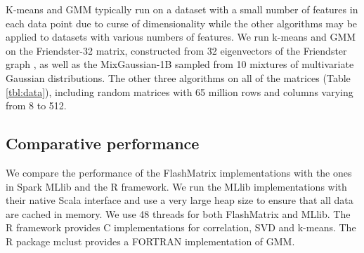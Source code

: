 K-means and GMM typically run on a dataset with a small number of features
in each data point due to curse of dimensionality \cite{Jain00} while
the other algorithms may be applied to datasets with various numbers of
features.
We run k-means and GMM on
the Friendster-32 matrix, constructed from 32 eigenvectors of the Friendster
graph \cite{friendster}, as well as the MixGaussian-1B
sampled from 10 mixtures of multivariate Gaussian distributions.
The other three algorithms on all of the matrices (Table \ref{tbl:data}),
including random matrices with 65 million rows and columns
varying from 8 to 512.

%


\vspace{-8pt}
\subsection{Comparative performance}
\vspace{-4pt}

We compare the performance of the FlashMatrix implementations with the ones in
Spark MLlib \cite{mllib} and the R framework. We run the MLlib implementations
with their native Scala interface and use a very large heap size to ensure that
all data are cached in memory. We use 48 threads for both FlashMatrix and
MLlib. %
The R framework provides C implementations for correlation, SVD and k-means.
The R package mclust \cite{mclust} provides a FORTRAN implementation of GMM.

